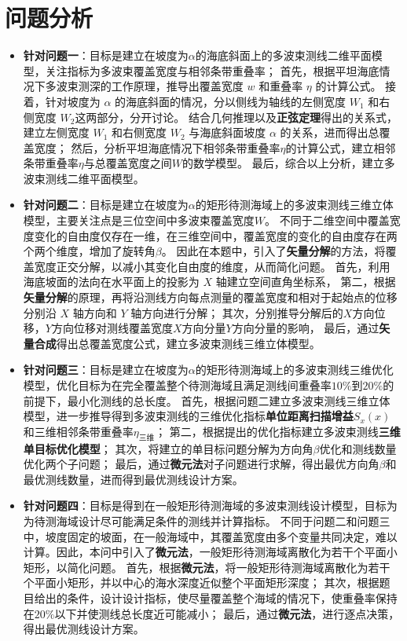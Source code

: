 \documentclass[withoutpreface,bwprint]{cumcmthesis} %
\begin{document}
    \section{问题分析}
    \begin{itemize}
        \item \textbf{针对问题一}：目标是建立在坡度为$\alpha$的海底斜面上的多波束测线二维平面模型，关注指标为多波束覆盖宽度与相邻条带重叠率；
        首先，根据平坦海底情况下多波束测深的工作原理，推导出覆盖宽度 $w$ 和重叠率 $\eta$ 的计算公式。
        接着，针对坡度为 $\alpha$ 的海底斜面的情况，分以侧线为轴线的左侧宽度 $W_1$ 和右侧宽度 $W_2$这两部分，分开讨论。
        结合几何推理以及\textbf{正弦定理}得出的关系式，建立左侧宽度 $W_1$ 和右侧宽度 $W_2$ 与海底斜面坡度 $\alpha$ 的关系，进而得出总覆盖宽度；
        然后，分析平坦海底情况下相邻条带重叠率$\eta$的计算公式，建立相邻条带重叠率$\eta$与总覆盖宽度之间$W$的数学模型。
        最后，综合以上分析，建立多波束测线二维平面模型。
     
        \item \textbf{针对问题二}：目标是建立在坡度为$\alpha$的矩形待测海域上的多波束测线三维立体模型，主要关注点是三位空间中多波束覆盖宽度$W$。
        不同于二维空间中覆盖宽度变化的自由度仅存在一维，在三维空间中，覆盖宽度的变化的自由度存在两个两个维度，增加了旋转角$\beta$。
        因此在本题中，引入了\textbf{矢量分解}的方法，将覆盖宽度正交分解，以减小其变化自由度的维度，从而简化问题。
        首先，利用海底坡面的法向在水平面上的投影为 $X$ 轴建立空间直角坐标系，
        第二，根据\textbf{矢量分解}的原理，再将沿测线方向每点测量的覆盖宽度和相对于起始点的位移分别沿 $X$ 轴方向和 $Y$ 轴方向进行分解；
        其次，分别推导分解后的$X$方向位移，$Y$方向位移对测线覆盖宽度$X$方向分量$Y$方向分量的影响，
        最后，通过\textbf{矢量合成}得出总覆盖宽度公式，建立多波束测线三维立体模型。
        \item \textbf{针对问题三}：目标是建立在坡度为$\alpha$的矩形待测海域上的多波束测线三维优化模型，优化目标为在完全覆盖整个待测海域且满足测线间重叠率$10\%$到$20\%$的前提下，最小化测线的总长度。
        首先，根据问题二建立多波束测线三维立体模型，进一步推导得到多波束测线的三维优化指标\textbf{单位距离扫描增益}$S_x(x)$和三维相邻条带重叠率$\eta_{\text{三维}}$；
        第二，根据提出的优化指标建立多波束测线\textbf{三维单目标优化模型}；
        其次，将建立的单目标问题分解为方向角$\beta$优化和测线数量优化两个子问题；
        最后，通过\textbf{微元法}对子问题进行求解，得出最优方向角$\beta$和最优测线数量，进而得到最优测线设计方案。
        \item \textbf{针对问题四}：目标是得到在一般矩形待测海域的多波束测线设计模型，目标为为待测海域设计尽可能满足条件的测线并计算指标。
        不同于问题二和问题三中，坡度固定的坡面，在一般海域中，其覆盖宽度由多个变量共同决定，难以计算。因此，本问中引入了\textbf{微元法}，一般矩形待测海域离散化为若干个平面小矩形，以简化问题。
        首先，根据\textbf{微元法}，将一般矩形待测海域离散化为若干个平面小矩形，并以中心的海水深度近似整个平面矩形深度；
        其次，根据题目给出的条件，设计设计指标，使尽量覆盖整个海域的情况下，使重叠率保持在$20\%$以下并使测线总长度近可能减小；
        最后，通过\textbf{微元法}，进行逐点决策，得出最优测线设计方案。
    \end{itemize} 
\end{document}
